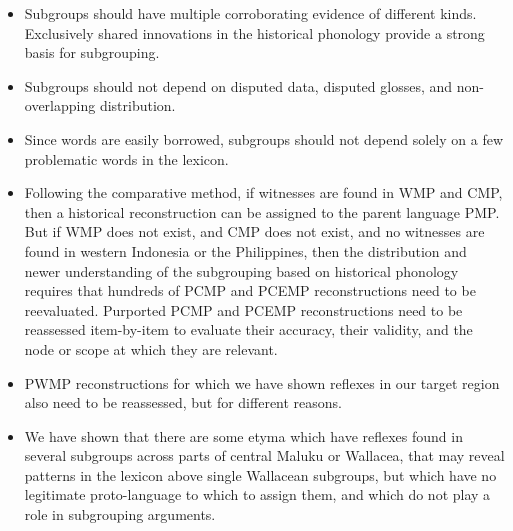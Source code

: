 \begin{itemize}
	\item	Subgroups should have multiple corroborating evidence of different kinds.
				Exclusively shared innovations in the historical phonology provide
				a strong basis for subgrouping.
	\item	Subgroups should not depend on disputed data,
				disputed glosses, and non-overlapping distribution.
	\item	Since words are easily borrowed,
				subgroups should not depend solely on a few problematic words in the lexicon.
	\item	Following the comparative method,
				if witnesses are found in WMP
				and CMP, then a historical reconstruction can be assigned to
				the parent language PMP.
				But if WMP does not exist, and CMP does not exist,
				and no witnesses are found in western Indonesia or the Philippines,
				then the distribution and newer understanding of the subgrouping
				based on historical phonology requires that hundreds of PCMP
				and PCEMP reconstructions need to be reevaluated.
				Purported PCMP and PCEMP reconstructions need to be reassessed
				item-by-item to evaluate their accuracy,
				their validity, and the node or scope at which they are relevant.
	\item	PWMP reconstructions for which we have shown reflexes in
				our target region also need to be reassessed,
				but for different reasons.
	\item	We have shown that there are some etyma which have reflexes
				found in several subgroups across parts of central Maluku or
				Wallacea, that may reveal patterns in the lexicon above single Wallacean
				subgroups, but which have no legitimate proto-language to which to assign
				them, and which do not play a role in subgrouping arguments.
\end{itemize}